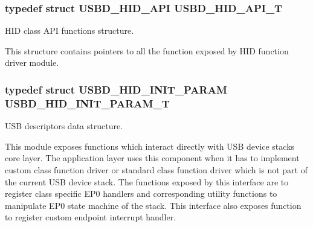 \subsubsection[{\texorpdfstring{U\+S\+B\+D\+\_\+\+H\+I\+D\+\_\+\+A\+P\+I\+\_\+T}{USBD_HID_API_T}}]{\setlength{\rightskip}{0pt plus 5cm}typedef struct {\bf U\+S\+B\+D\+\_\+\+H\+I\+D\+\_\+\+A\+PI}  {\bf U\+S\+B\+D\+\_\+\+H\+I\+D\+\_\+\+A\+P\+I\+\_\+T}}\hypertarget{group__USBD__HID_ga48d7b7f66a852d99dfbe2c419cc408ba}{}\label{group__USBD__HID_ga48d7b7f66a852d99dfbe2c419cc408ba}


H\+ID class A\+PI functions structure.

This structure contains pointers to all the function exposed by H\+ID function driver module. 

\subsubsection[{\texorpdfstring{U\+S\+B\+D\+\_\+\+H\+I\+D\+\_\+\+I\+N\+I\+T\+\_\+\+P\+A\+R\+A\+M\+\_\+T}{USBD_HID_INIT_PARAM_T}}]{\setlength{\rightskip}{0pt plus 5cm}typedef struct {\bf U\+S\+B\+D\+\_\+\+H\+I\+D\+\_\+\+I\+N\+I\+T\+\_\+\+P\+A\+R\+AM}  {\bf U\+S\+B\+D\+\_\+\+H\+I\+D\+\_\+\+I\+N\+I\+T\+\_\+\+P\+A\+R\+A\+M\+\_\+T}}\hypertarget{group__USBD__HID_ga192251fa5ec461eaa9a77b76dbe7c3fa}{}\label{group__USBD__HID_ga192251fa5ec461eaa9a77b76dbe7c3fa}


U\+SB descriptors data structure. 

This module exposes functions which interact directly with U\+SB device stack\textquotesingle{}s core layer. The application layer uses this component when it has to implement custom class function driver or standard class function driver which is not part of the current U\+SB device stack. The functions exposed by this interface are to register class specific E\+P0 handlers and corresponding utility functions to manipulate E\+P0 state machine of the stack. This interface also exposes function to register custom endpoint interrupt handler. 